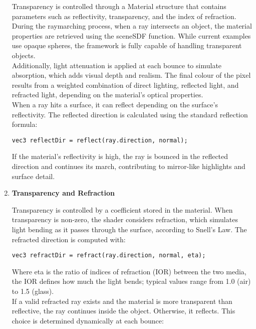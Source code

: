 \documentclass{rapportcs}
\begin{document}
\begin{enumerate}
        \noindent Transparency is controlled through a Material structure that contains parameters such as reflectivity, transparency, and the index of refraction. During the raymarching process, when a ray intersects an object, the material properties are retrieved using the sceneSDF function. While current examples use opaque spheres, the framework is fully capable of handling transparent objects.\\

       \noindent Additionally, light attenuation is applied at each bounce to simulate absorption, which adds visual depth and realism. The final colour of the pixel results from a weighted combination of direct lighting, reflected light, and refracted light, depending on the material's optical properties.\\

        \noindent When a ray hits a surface, it can reflect depending on the surface's reflectivity. The reflected direction is calculated using the standard reflection formula:

        \begin{lstlisting}[style=cppstyle]
vec3 reflectDir = reflect(ray.direction, normal);
        \end{lstlisting}

        \noindent If the material's reflectivity is high, the ray is bounced in the reflected direction and continues its march, contributing to mirror-like highlights and surface detail.\\


      \item \textbf{Transparency and Refraction}
        
        Transparency is controlled by a coefficient stored in the material. When transparency is non-zero, the shader considers refraction, which simulates light bending as it passes through the surface, according to Snell’s Law. The refracted direction is computed with:

        \begin{lstlisting}[style=cppstyle]
vec3 refractDir = refract(ray.direction, normal, eta);
        \end{lstlisting}
        
        \noindent Where eta is the ratio of indices of refraction (IOR) between the two media, the IOR defines how much the light bends; typical values range from 1.0 (air) to 1.5 (glass).\\

        \noindent If a valid refracted ray exists and the material is more transparent than reflective, the ray continues inside the object. Otherwise, it reflects. This choice is determined dynamically at each bounce:


\end{enumerate}
\end{document}
